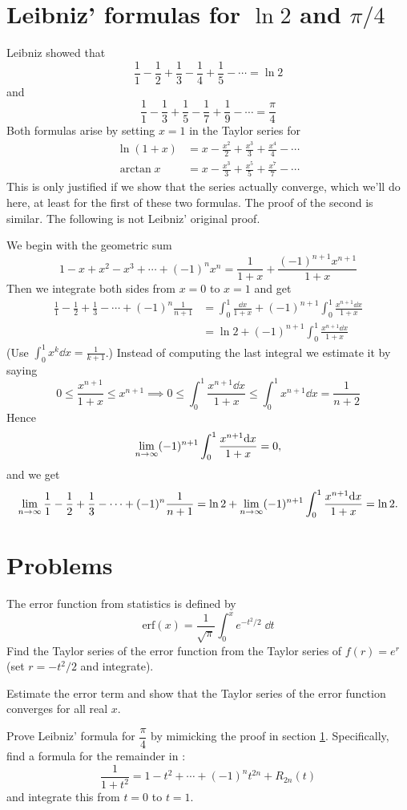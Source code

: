 \section{Leibniz' formulas for $\ln 2$ and $\pi/4$} %
\label{sec:Leibniz-formulas}
Leibniz showed that
\[
\frac11-\frac12+\frac13-\frac14+\frac15-\cdots = \ln 2
\]
and
\[
\frac11-\frac13+\frac15-\frac17+\frac19-\cdots = \frac\pi4
\]
Both formulas arise by setting $x=1$ in the Taylor series for
\begin{align*}
  \ln (1+x) &= x-\frac{x^2}2+\frac{x^3}3+\frac{x^4}4-\cdots \\
  \arctan x &= x-\frac{x^3}3+\frac{x^5}5+\frac{x^7}7-\cdots
\end{align*}
This is only justified if we show that the series actually converge, which
we'll do here, at least for the first of these two formulas. The proof of
the second is similar.  The following is not Leibniz' original proof.

We begin with the geometric sum
\[
1-x+x^2-x^3+\cdots+ (-1)^n x^n = \frac1{1+x} +
\frac{(-1)^{n+1}x^{n+1}}{1+x}
\]
Then we integrate both sides from $x=0$ to $x=1$ and get
\begin{align*}
  \frac11-\frac12+\frac13-\cdots+(-1)^n\frac1{n+1} &= \int_0^1\frac{\dd
  x}{1+x}
  +(-1)^{n+1}\int_0^1\frac{x^{n+1}\dd x}{1+x} \\
  &=\ln 2 +(-1)^{n+1}\int_0^1\frac{x^{n+1}\dd x}{1+x}
\end{align*}
(Use $\int_0^1x^k\dd x=\frac1{k+1}$.)  Instead of computing the last
integral we estimate it by saying
\[
0\leq \frac{x^{n+1}}{1+x}\leq x^{n+1} \implies 0\leq
\int_0^1\frac{x^{n+1}\dd x}{1+x} \leq \int_0^1x^{n+1}\dd x=\frac1{n+2}
\]
Hence
\[
\lim_{n\to\infty} (-1)^{n+1}\int_0^1\frac{x^{n+1}\mathrm{d} x}{1+x} =0,
\]
and we get
\[
  \lim_{n\to\infty}\frac11-\frac12+\frac13-\cdots+(-1)^n\frac1{n+1}
  =\ln 2+\lim_{n\to\infty} (-1)^{n+1}\int_0^1\frac{x^{n+1}\mathrm{d} x}{1+x} 
  = \ln 2.
\]



\section{Problems} %
\problemfont %
\begin{multicols}{2}
\problem \groupproblem  The error function from statistics is defined by %
\[
\mathrm{erf}(x) = \frac1{\sqrt{\pi}}\int_0^x e^{-t^2/2}\;\dd t
\]
\subprob Find the Taylor series of the error function from the Taylor series
of $f(r)=e^r$ (set $r=-t^2/2$ and integrate).

\subprob Estimate the error term and show that the Taylor series of the error
function converges for all real $x$.


\problem \groupproblem  Prove Leibniz' formula for $\dfrac\pi4$ by mimicking the proof %
in section \ref{sec:Leibniz-formulas}. Specifically, find a formula for
the remainder in :
\[
\frac1{1+t^2} = 1-t^2+\cdots+ (-1)^nt^{2n}+ R_{2n}(t)
\]
and integrate this from $t=0$ to $t=1$.
\end{multicols}
\noproblemfont

